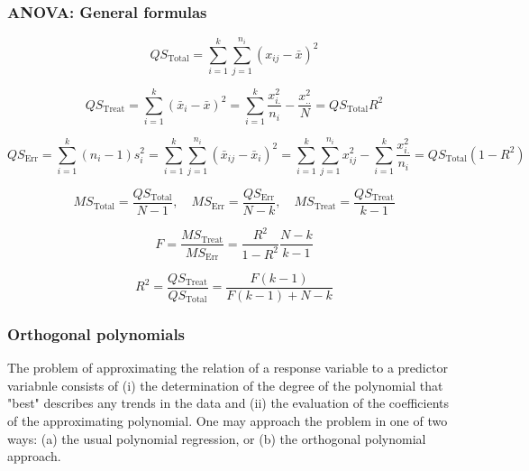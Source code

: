 \subsubsection{ANOVA: General formulas}

\begin{equation}
	QS_{\text{Total}} = \sum_{i=1}^k \sum_{j=1}^{n_i} \left(x_{ij} - \bar{x}   \right)^2
\end{equation}

\begin{equation}
	QS_{\text{Treat}} = \sum_{i=1}^k  \left(\bar{x}_{i} - \bar{x} \right)^2  = \sum_{i=1}^k  \frac{x_{i.}^2}{n_i} - \frac{x_{..}^2}{N} = QS_{\text{Total}} R^2
\end{equation}

\begin{equation}
	QS_{\text{Err}} = \sum_{i=1}^k(n_i-1)s_i^2 = \sum_{i=1}^k \sum_{j=1}^{n_i}  \left(\bar{x}_{ij} - \bar{x}_i \right)^2  = \sum_{i=1}^k \sum_{j=1}^{n_i} x_{ij}^2 - \sum_{i=1}^k \frac{x_{i.}^2}{n_i} = QS_{\text{Total}}(1-R^2)
\end{equation}


\begin{equation}
	MS_{\text{Total}} = \frac{QS_{\text{Total}}}{N-1}, \quad MS_{\text{Err}} = \frac{QS_{\text{Err}}}{N-k} , \quad MS_{\text{Treat}} = \frac{QS_{\text{Treat}}}{k-1}
\end{equation}

\begin{equation}
	F = \frac{MS_{\text{Treat}}}{MS_{\text{Err}}} = \frac{R^2}{1-R^2} \frac{N-k}{k-1}
\end{equation}

\begin{equation}
	R^2 = \frac{QS_{\text{Treat}}}{QS_{\text{Total}}} = \frac{F(k-1)}{F(k-1)+N-k}
\end{equation}



\subsubsection{Orthogonal polynomials}

The problem of approximating the relation of a response variable to a predictor variabnle consists of (i) the determination of the degree of the polynomial that "best" describes any trends in the data and (ii) the evaluation of the coefficients of the approximating polynomial. One may approach the problem in one of two ways: (a) the usual polynomial regression, or (b) the orthogonal polynomial approach.


